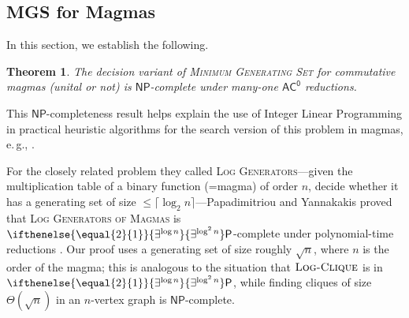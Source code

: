 \documentclass{article}
\newtheorem{theorem}{Theorem}\newtheorem{lemma}[theorem]{Lemma}\newtheorem{proposition}[theorem]{Proposition}\newtheorem{corollary}[theorem]{Corollary}\newtheorem{definition}[theorem]{Definition}\newtheorem{claim}[theorem]{Claim}\newtheorem{remark}[theorem]{Remark}\newtheorem{observation}[theorem]{Observation}\newtheorem{conjecture}[theorem]{Conjecture}\newtheorem{example}[theorem]{Example}
\newcommand{\algprobm}[1]{\textsc{#1}\xspace}
\newcommand{\betacc}[1]{\ifthenelse{\equal{#1}{1}}{\exists^{\log n}}{\exists^{\log^{#1}n}}} %
\newcommand*{\ComplexityClass}[1]{\ensuremath{\mathsf{#1}}\xspace}
\newcommand*{\NP}{\ComplexityClass{NP}}
\renewcommand{\P}{\ComplexityClass{P}}
\newcommand{\ACz}{\ComplexityClass{AC^0}}
\begin{document}
\subsection{MGS for Magmas}

In this section, we establish the following.

\begin{theorem} \label{thm:magma}
    The decision variant of \algprobm{Minimum Generating Set} for commutative magmas (unital or not) is \NP-complete under many-one $\ACz$ reductions.
\end{theorem}


This \NP-completeness result helps explain the use of Integer Linear Programming in practical heuristic algorithms for the search version of this problem in magmas, e.\,g., \cite{JMV}.

For the closely related problem they called \algprobm{Log Generators}---given the multiplication table of a binary function (=magma) of order $n$, decide whether it has a generating set of size $\leq \lceil \log_2 n \rceil$---Papadimitriou and Yannakakis  proved that \algprobm{Log Generators of Magmas} is $\betacc{2} \mathsf{P}$-complete under polynomial-time reductions \cite[Thm.~7]{PY}. 
%
Our proof uses a generating set of size roughly $\sqrt{n}$, where $n$ is the order of the magma; this is analogous to the situation that $\algprobm{Log-Clique}$ is in $\betacc{2} \P$, while finding cliques of size $\Theta(\sqrt{n})$ in an $n$-vertex graph is $\NP$-complete.
\end{document}
